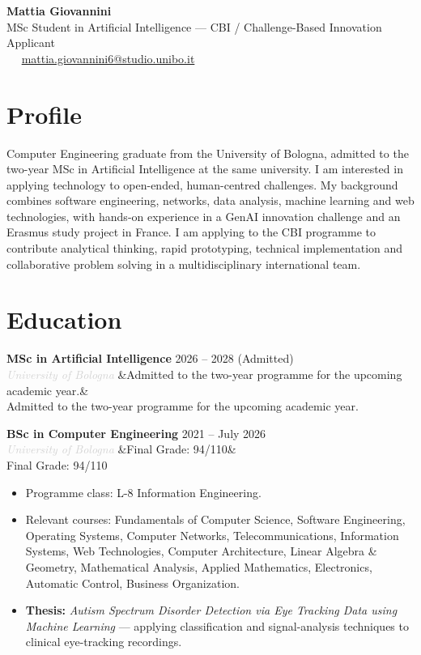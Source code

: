 \documentclass[a4paper,10pt]{article}
\newcommand{\entry}[4]{%
  \noindent\textbf{#1} \hfill \textcolor{accent}{#2}\\
  \textit{\textcolor{lightgray}{#3}}%
  \ifx&#4&\else\\\vspace{0.2em}#4\fi
  \vspace{0.5em}
}
\newcommand{\entrylist}[5]{%
  \noindent\textbf{#1} \hfill \textcolor{accent}{#2}\\
  \textit{\textcolor{lightgray}{#3}}%
  \ifx&#4&\else\\\vspace{0.2em}#4\fi
  \vspace{0.25em}
  \begin{itemize}#5\end{itemize}
  \vspace{0.25em}
}
\begin{document}
\begin{center}
  {\Huge\bfseries\color{darkgray} Mattia Giovannini}\\[0.35em]
  {\large\color{accent} MSc Student in Artificial Intelligence — CBI / Challenge-Based Innovation Applicant}\\[0.65em]
  \textcolor{lightgray}{
    \faPhone\ \PrivatePhone
    \quad\textbullet\quad
    \faEnvelope\ \href{mailto:mattia.giovannini6@studio.unibo.it}{mattia.giovannini6@studio.unibo.it}
  }
\end{center}

\vspace{0.35em}

\section{Profile}

Computer Engineering graduate from the University of Bologna, admitted to the two-year
MSc in Artificial Intelligence at the same university. I am interested
in applying technology to open-ended, human-centred challenges. My background combines software
engineering, networks, data analysis, machine learning and web technologies, with hands-on
experience in a GenAI innovation challenge and an Erasmus study project in France. I am applying
to the CBI programme to contribute analytical thinking, rapid prototyping, technical implementation
and collaborative problem solving in a multidisciplinary international team.

\section{Education}

\entry{MSc in Artificial Intelligence}{2026 -- 2028 (Admitted)}{University of Bologna}
{Admitted to the two-year programme for the upcoming academic year.}

\entrylist{BSc in Computer Engineering}{2021 -- July 2026}{University of Bologna}{Final Grade: 94/110}{
  \item Programme class: L-8 Information Engineering.
  \item Relevant courses: Fundamentals of Computer Science, Software Engineering, Operating Systems,
        Computer Networks, Telecommunications, Information Systems, Web Technologies, Computer Architecture,
        Linear Algebra \& Geometry, Mathematical Analysis, Applied Mathematics, Electronics,
        Automatic Control, Business Organization.
  \item \textbf{Thesis:} \textit{Autism Spectrum Disorder Detection via Eye Tracking Data using Machine Learning} — applying classification and signal-analysis techniques to clinical eye-tracking recordings.
}
\end{document}
